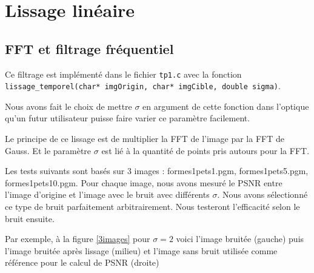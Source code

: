\documentclass[paper=a4, fontsize=11pt]{scrartcl} %
\begin{document}
\section{Lissage linéaire}
\subsection{FFT et filtrage fréquentiel}
Ce filtrage est implémenté dans le fichier \texttt{tp1.c} avec la fonction \texttt{lissage\_temporel(char* imgOrigin, char* imgCible, double sigma)}. 

Nous avons fait le choix de mettre $\sigma$ en argument de cette fonction dans l'optique qu'un futur utilisateur puisse faire varier ce paramètre facilement. 

Le principe de ce lissage est de multiplier la FFT de l'image par la FFT de Gauss. Et le paramètre $\sigma$ est lié à la quantité de points pris autours pour la FFT. 

Les tests suivants sont basés sur 3 images : formes1pets1.pgm, formes1pets5.pgm, formes1pets10.pgm. Pour chaque image, nous avons mesuré le PSNR entre l'image d'origine et l'image avec le bruit avec différents $\sigma$. Nous avons sélectionné ce type de bruit parfaitement arbitrairement. Nous testeront l'efficacité selon le bruit ensuite. 


Par exemple, à la figure \ref{3images} pour $\sigma=2$ voici l'image bruitée (gauche) puis l'image bruitée après lissage (milieu) et l'image sans bruit utilisée comme référence pour le calcul de PSNR (droite)
\end{document}
